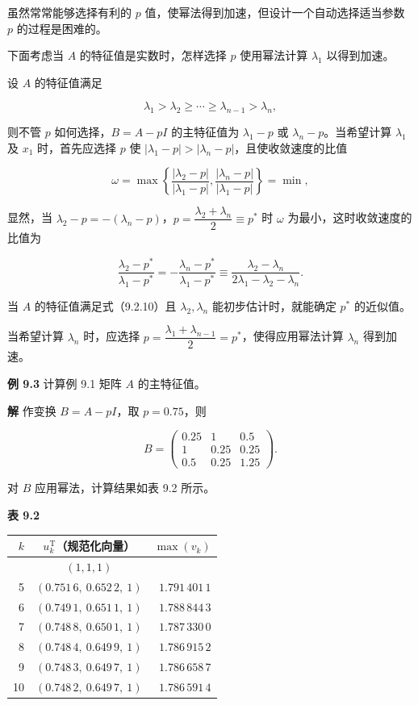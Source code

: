 \documentclass[
  10pt,
  fontset=fandol]{ctexart}
\newcounter{none} %
\begin{document}
虽然常常能够选择有利的 \(p\) 值，使幂法得到加速，但设计一个自动选择适当参数 \(p\) 的过程是困难的。

下面考虑当 \(A\) 的特征值是实数时，怎样选择 \(p\) 使用幂法计算 \(\lambda_1\) 以得到加速。

设 \(A\) 的特征值满足

\[
\lambda_1>\lambda_2\geq\cdots\geq\lambda_{n-1}>\lambda_n,
\tag{9.2.10}
\]

则不管 \(p\) 如何选择，\(B=A-pI\) 的主特征值为 \(\lambda_1-p\) 或 \(\lambda_n-p\)。当希望计算 \(\lambda_1\) 及 \(x_1\) 时，首先应选择 \(p\) 使 \(|\lambda_1-p|>|\lambda_n-p|\)，且使收敛速度的比值

\[
\omega=\max\left\{\frac{|\lambda_2-p|}{|\lambda_1-p|},\frac{|\lambda_n-p|}{|\lambda_1-p|}\right\}=\min,
\]

显然，当 \(\lambda_2-p=-(\lambda_n-p)\)，\(p=\dfrac{\lambda_2+\lambda_n}{2}\equiv p^*\) 时 \(\omega\) 为最小，这时收敛速度的比值为

\[
\frac{\lambda_2-p^*}{\lambda_1-p^*}=-\frac{\lambda_n-p^*}{\lambda_1-p^*}\equiv\frac{\lambda_2-\lambda_n}{2\lambda_1-\lambda_2-\lambda_n}.
\]

当 \(A\) 的特征值满足式（9.2.10）且 \(\lambda_2,\lambda_n\) 能初步估计时，就能确定 \(p^*\) 的近似值。

当希望计算 \(\lambda_n\) 时，应选择 \(p=\dfrac{\lambda_1+\lambda_{n-1}}{2}=p^*\)，使得应用幂法计算 \(\lambda_n\) 得到加速。

\textbf{例 9.3} 计算例 9.1 矩阵 \(A\) 的主特征值。

\textbf{解} 作变换 \(B=A-pI\)，取 \(p=0.75\)，则

\[
B=\begin{pmatrix}
0.25&1&0.5\\
1&0.25&0.25\\
0.5&0.25&1.25
\end{pmatrix}.
\]

对 \(B\) 应用幂法，计算结果如表 9.2 所示。

\textbf{表 9.2}

{\def\LTcaptype{none} %
\begin{longtable}[]{@{}rcr@{}}
\toprule\noalign{}
\(k\) & \(u_k^{\mathrm T}\)（规范化向量） & \(\max(v_k)\) \\
\midrule\noalign{}
\endhead
\bottomrule\noalign{}
\endlastfoot
0 & \((1,1,1)\) & \\
5 & \((0.751\,6,\ 0.652\,2,\ 1)\) & \(1.791\,401\,1\) \\
6 & \((0.749\,1,\ 0.651\,1,\ 1)\) & \(1.788\,844\,3\) \\
7 & \((0.748\,8,\ 0.650\,1,\ 1)\) & \(1.787\,330\,0\) \\
8 & \((0.748\,4,\ 0.649\,9,\ 1)\) & \(1.786\,915\,2\) \\
9 & \((0.748\,3,\ 0.649\,7,\ 1)\) & \(1.786\,658\,7\) \\
10 & \((0.748\,2,\ 0.649\,7,\ 1)\) & \(1.786\,591\,4\) \\
\end{longtable}
}
\end{document}
